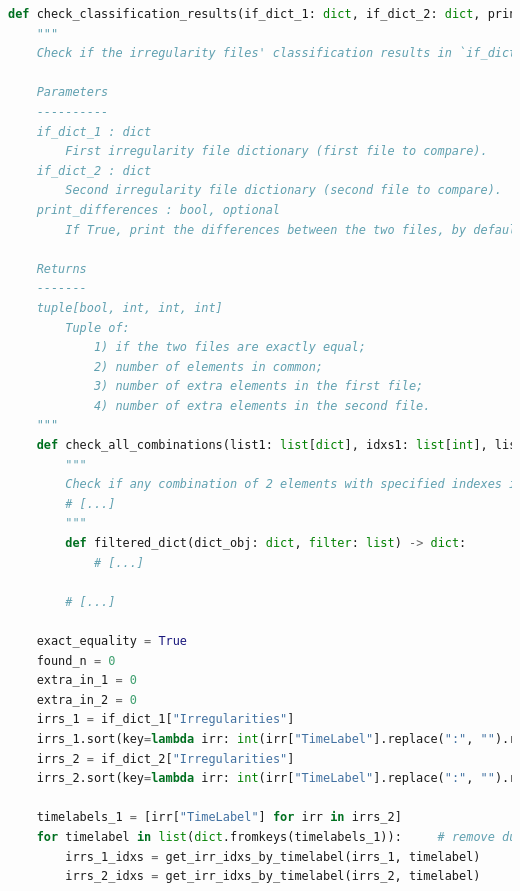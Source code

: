 \begin{lstlisting}[language=Python, caption=Codice che testa la costanza dei risultati della classificazione in Audio Analyser]
def check_classification_results(if_dict_1: dict, if_dict_2: dict, print_differences: bool = False) -> (bool, int, int, int):
    """
    Check if the irregularity files' classification results in `if_dict_1` are exactly equal to `if_dict_2`.

    Parameters
    ----------
    if_dict_1 : dict
        First irregularity file dictionary (first file to compare).
    if_dict_2 : dict
        Second irregularity file dictionary (second file to compare).
    print_differences : bool, optional
        If True, print the differences between the two files, by default False.

    Returns
    -------
    tuple[bool, int, int, int]
        Tuple of:
            1) if the two files are exactly equal;
            2) number of elements in common;
            3) number of extra elements in the first file;
            4) number of extra elements in the second file.
    """
    def check_all_combinations(list1: list[dict], idxs1: list[int], list2: list[dict], idxs2: list[int]) -> (int | None, int | None):
        """
        Check if any combination of 2 elements with specified indexes in two different lists is equal and return the indexes of the first equal elements found.
        # [...]
        """
        def filtered_dict(dict_obj: dict, filter: list) -> dict:
            # [...]

        # [...]

    exact_equality = True
    found_n = 0
    extra_in_1 = 0
    extra_in_2 = 0
    irrs_1 = if_dict_1["Irregularities"]
    irrs_1.sort(key=lambda irr: int(irr["TimeLabel"].replace(":", "").replace(".", "")))  # FIXME workaround for ":" timelabel problem from video analyser
    irrs_2 = if_dict_2["Irregularities"]
    irrs_2.sort(key=lambda irr: int(irr["TimeLabel"].replace(":", "").replace(".", "")))

    timelabels_1 = [irr["TimeLabel"] for irr in irrs_2]
    for timelabel in list(dict.fromkeys(timelabels_1)):     # remove duplicates
        irrs_1_idxs = get_irr_idxs_by_timelabel(irrs_1, timelabel)
        irrs_2_idxs = get_irr_idxs_by_timelabel(irrs_2, timelabel)


\end{lstlisting}

